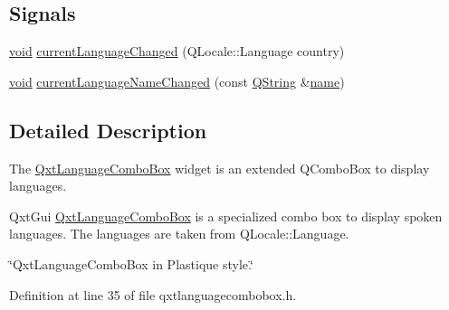 \subsection*{Signals}
\begin{DoxyCompactItemize}
\item 
\hyperlink{group___u_a_v_objects_plugin_ga444cf2ff3f0ecbe028adce838d373f5c}{void} \hyperlink{class_qxt_language_combo_box_acd4e04e92e92b472ee727dabf4fd103e}{current\-Language\-Changed} (Q\-Locale\-::\-Language country)
\item 
\hyperlink{group___u_a_v_objects_plugin_ga444cf2ff3f0ecbe028adce838d373f5c}{void} \hyperlink{class_qxt_language_combo_box_a068edf82a7da546c485eb061ee94abbe}{current\-Language\-Name\-Changed} (const \hyperlink{group___u_a_v_objects_plugin_gab9d252f49c333c94a72f97ce3105a32d}{Q\-String} \&\hyperlink{glext_8h_ad977737dfc9a274a62741b9500c49a32}{name})
\end{DoxyCompactItemize}


\subsection{Detailed Description}
The \hyperlink{class_qxt_language_combo_box}{Qxt\-Language\-Combo\-Box} widget is an extended Q\-Combo\-Box to display languages. 

Qxt\-Gui \hyperlink{class_qxt_language_combo_box}{Qxt\-Language\-Combo\-Box} is a specialized combo box to display spoken languages. The languages are taken from Q\-Locale\-::\-Language.

\char`\"{}\-Qxt\-Language\-Combo\-Box in Plastique style.\char`\"{} 

Definition at line 35 of file qxtlanguagecombobox.\-h.



